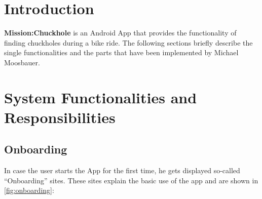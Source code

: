 \documentclass[10pt,a4paper]{article} %
\begin{document}
    \pagestyle{plain}
    \title{\rmfamily\normalfont{}}
    \author{}
    \date{} %
    
    \maketitle
    
       
    \tableofcontents



    
    \section{Introduction}
	\textbf{Mission:Chuckhole} is an Android App that provides the functionality of finding chuckholes during a bike ride. 
	The following sections briefly describe the single functionalities and the parts that have been implemented by Michael Moosbauer.
    
    \section{System Functionalities and Responsibilities}

	\subsection{Onboarding}
		In case the user starts the App for the first time, he gets displayed so-called ``Onboarding'' sites.
		These sites explain the basic use of the app and are shown in \autoref{fig:onboarding}:
\end{document}
